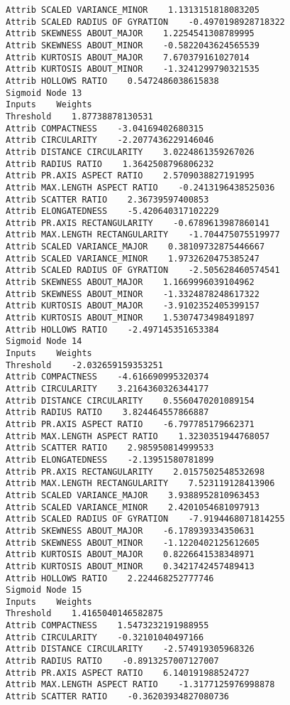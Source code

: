 \documentclass[
	article,			%
	11pt,				%
	oneside,			%
	a4paper,			%
	english,			%
	brazil,				%
	sumario=tradicional
	]{abntex2}
\begin{document}
\begin{lstlisting}
Attrib SCALED VARIANCE_MINOR    1.1313151818083205
Attrib SCALED RADIUS OF GYRATION    -0.4970198928718322
Attrib SKEWNESS ABOUT_MAJOR    1.2254541308789995
Attrib SKEWNESS ABOUT_MINOR    -0.5822043624565539
Attrib KURTOSIS ABOUT_MAJOR    7.670379161027014
Attrib KURTOSIS ABOUT_MINOR    -1.3241299790321535
Attrib HOLLOWS RATIO    0.5472486038615838
Sigmoid Node 13
Inputs    Weights
Threshold    1.87738878130531
Attrib COMPACTNESS    -3.04169402680315
Attrib CIRCULARITY    -2.2077436229146046
Attrib DISTANCE CIRCULARITY    3.0224861359267026
Attrib RADIUS RATIO    1.3642508796806232
Attrib PR.AXIS ASPECT RATIO    2.5709038827191995
Attrib MAX.LENGTH ASPECT RATIO    -0.2413196438525036
Attrib SCATTER RATIO    2.36739597400853
Attrib ELONGATEDNESS    -5.420640317102229
Attrib PR.AXIS RECTANGULARITY    -0.6789613987860141
Attrib MAX.LENGTH RECTANGULARITY    -1.704475075519977
Attrib SCALED VARIANCE_MAJOR    0.38109732875446667
Attrib SCALED VARIANCE_MINOR    1.9732620475385247
Attrib SCALED RADIUS OF GYRATION    -2.505628460574541
Attrib SKEWNESS ABOUT_MAJOR    1.1669996039104962
Attrib SKEWNESS ABOUT_MINOR    -1.3324878248617322
Attrib KURTOSIS ABOUT_MAJOR    -3.9102352405399157
Attrib KURTOSIS ABOUT_MINOR    1.5307473498491897
Attrib HOLLOWS RATIO    -2.497145351653384
Sigmoid Node 14
Inputs    Weights
Threshold    -2.032659159353251
Attrib COMPACTNESS    -4.616690995320374
Attrib CIRCULARITY    3.2164360326344177
Attrib DISTANCE CIRCULARITY    0.5560470201089154
Attrib RADIUS RATIO    3.824464557866887
Attrib PR.AXIS ASPECT RATIO    -6.797785179662371
Attrib MAX.LENGTH ASPECT RATIO    1.3230351944768057
Attrib SCATTER RATIO    2.985950814999533
Attrib ELONGATEDNESS    -2.13951580781899
Attrib PR.AXIS RECTANGULARITY    2.0157502548532698
Attrib MAX.LENGTH RECTANGULARITY    7.523119128413906
Attrib SCALED VARIANCE_MAJOR    3.9388952810963453
Attrib SCALED VARIANCE_MINOR    2.4201054681097913
Attrib SCALED RADIUS OF GYRATION    -7.9194468071814255
Attrib SKEWNESS ABOUT_MAJOR    -6.178939334350631
Attrib SKEWNESS ABOUT_MINOR    -1.1220402125612605
Attrib KURTOSIS ABOUT_MAJOR    0.8226641538348971
Attrib KURTOSIS ABOUT_MINOR    0.3421742457489413
Attrib HOLLOWS RATIO    2.224468252777746
Sigmoid Node 15
Inputs    Weights
Threshold    1.4165040146582875
Attrib COMPACTNESS    1.5473232191988955
Attrib CIRCULARITY    -0.32101040497166
Attrib DISTANCE CIRCULARITY    -2.574919305968326
Attrib RADIUS RATIO    -0.8913257007127007
Attrib PR.AXIS ASPECT RATIO    6.140191988524727
Attrib MAX.LENGTH ASPECT RATIO    -1.3177125976998878
Attrib SCATTER RATIO    -0.36203934827080736

\end{lstlisting}
\end{document}
